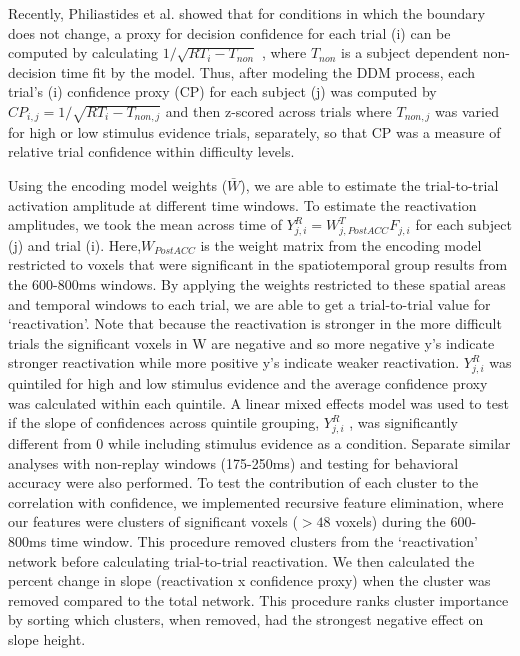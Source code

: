 Recently, Philiastides et al. \cite{Philiastides2014} showed that for conditions in which the boundary does not change, a proxy for decision confidence for each trial (i) can be computed by calculating $1/\sqrt{RT_{i}-T_{non}}$ , where $T_{non}$ is a subject dependent non-decision time fit by the model. Thus, after modeling the DDM process, each trial's (i) confidence proxy (CP) for each subject (j) was computed by $CP_{i,j} = 1/ \sqrt{RT_{i}-T_{non,j}}$  and then z-scored across trials where $T_{non,j}$ was varied for high or low stimulus evidence trials, separately, so that CP was a measure of relative trial confidence within difficulty levels. 

Using the encoding model weights ($\bar{W}$), we are able to estimate the trial-to-trial activation amplitude at different time windows. To estimate the reactivation amplitudes, we took the mean across time of $Y^{R}_{j,i} = W^{T}_{j,PostACC}F_{j,i}$  for each subject (j) and trial (i). Here,$W_{PostACC}$ is the weight matrix from the encoding model restricted to voxels that were significant in the spatiotemporal group results from the 600-800ms windows. By applying the weights restricted to these spatial areas and temporal windows to each trial, we are able to get a trial-to-trial value for ‘reactivation’. Note that because the reactivation is stronger in the more difficult trials the significant voxels in W are negative and so more negative y's indicate stronger reactivation while more positive y's indicate weaker reactivation. $Y^{R}_{j,i}$ was quintiled for high and low stimulus evidence and the average confidence proxy was calculated within each quintile. A linear mixed effects model \cite{Bates2015} was used to test if the slope of confidences across quintile grouping, $Y^{R}_{j,i}$ , was significantly different from 0 while including stimulus evidence as a condition. Separate similar analyses with non-replay windows (175-250ms) and testing for behavioral accuracy were also performed. To test the contribution of each cluster to the correlation with confidence, we implemented recursive feature elimination, where our features were clusters of significant voxels ($> 48$ voxels) during the 600-800ms time window. This procedure removed clusters from the ‘reactivation’ network before calculating trial-to-trial reactivation. We then calculated the percent change in slope (reactivation x confidence proxy) when the cluster was removed compared to the total network. This procedure ranks cluster importance by sorting which clusters, when removed, had the strongest negative effect on slope height.

